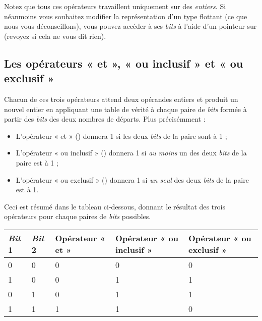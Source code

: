 \begin{attentionbox}
  Notez que tous ces opérateurs
travaillent uniquement sur des \emph{entiers}. \textbar{} \textbar{} Si
néanmoins vous souhaitez modifier la représentation d'un type flottant
(ce que nous vous déconseillons), vous pouvez accéder à ses \emph{bits}
à l'aide d'un pointeur sur  (revoyez
si cela ne vous dit rien).
\end{attentionbox}


\subsection{Les opérateurs « et », « ou inclusif » et « ou exclusif »}
\label{les-operateurs-et-ou-inclusif-et-ou-exclusif}

Chacun de ces trois opérateurs attend deux opérandes entiers et produit
un nouvel entier en appliquant une table de vérité à chaque paire de
\emph{bits} formée à partir des \emph{bits} des deux nombres de départs.
Plus précisémment :

\begin{itemize}
\item
  L'opérateur « et » (\mybox{\&}) donnera 1 si les deux \emph{bits} de
  la paire sont à 1 ;
\item
  L'opérateur « ou inclusif » (\mybox{\textbar{}}) donnera 1 si
  \emph{au moins} un des deux \emph{bits} de la paire est à 1 ;
\item
  L'opérateur « ou exclusif » (\mybox{\^{}}) donnera 1 si \emph{un
  seul} des deux \emph{bits} de la paire est à 1.
\end{itemize}

Ceci est résumé dans le tableau ci-dessous, donnant le résultat des
trois opérateurs pour chaque paires de \emph{bits} possibles.

\begin{table}
\centering
{}
\begin{tabular}{|l|l|p{2.2cm}|p{2.5cm}|p{2.5cm}|}\hline
\rowcolor{gris-tab-entete}
\textbf{\emph{Bit} 1}& \textbf{\emph{Bit} 2} & \textbf{Opérateur « et » } & \textbf{Opérateur « ou inclusif »} & \textbf{Opérateur « ou exclusif »}\tabularnewline\hline
0&0&0&0&0
\tabularnewline\hline
1&0&0&1&1
\tabularnewline\hline
0&1&0&1&1
\tabularnewline\hline
1&1&1&1&0
\tabularnewline\hline
\end{tabular}
\end{table}

